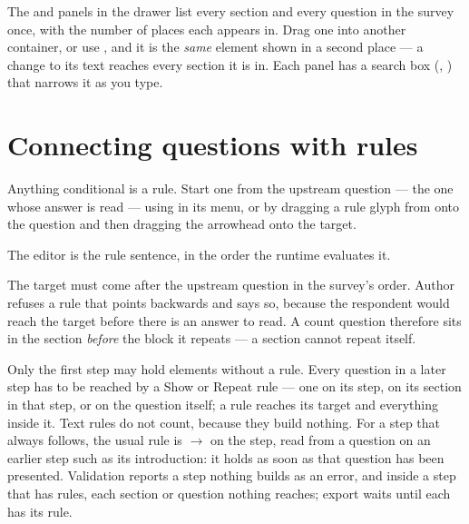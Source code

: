 \documentclass[11pt, a4paper]{article}
\begin{document}
The  and  panels in the drawer list every section and every question
in the survey once, with the number of places each appears in. Drag one into another container,
or use , and it is the \emph{same} element shown in a second place — a
change to its text reaches every section it is in. Each panel has a search box (, ) that narrows it as you type.


\section{Connecting questions with rules}
\label{sec:rules}

Anything conditional is a rule. Start one from the upstream question — the one whose answer is
read — using  in its menu, or by dragging a rule glyph from  onto the
question and then dragging the arrowhead onto the target.


The editor is the rule sentence, in the order the runtime evaluates it.


\begin{elicitcaution}
The target must come after the upstream question in the survey's order. Author refuses a rule
that points backwards and says so, because the respondent would reach the target before there is
an answer to read. A count question therefore sits in the section \emph{before} the block it
repeats — a section cannot repeat itself.
\end{elicitcaution}

\begin{elicitcaution}
Only the first step may hold elements without a rule. Every question in a later step has to be
reached by a Show or Repeat rule — one on its step, on its section in that step, or on the
question itself; a rule reaches its target and everything inside it. Text rules do not count,
because they build nothing. For a step that always follows, the usual rule is 
$\rightarrow$  on the step, read from a question on an earlier step such as its
introduction: it holds as soon as that question has been presented. Validation reports a step
nothing builds as an error, and inside a step that has rules, each section or question nothing
reaches; export waits until each has its rule.
\end{elicitcaution}
\end{document}
